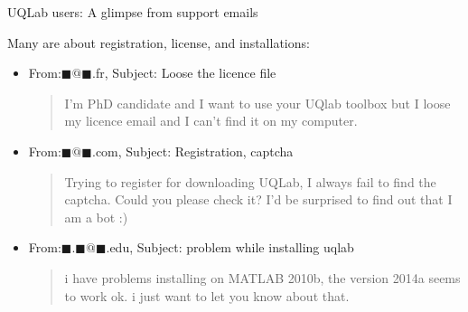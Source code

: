 \documentclass[]{rsuqbeamernew}
\begin{document}
\begin{frame}{UQLab users: A glimpse from support emails}
  
  Many are about registration, license, and installations:
  \begin{itemize}
    \item From:$\blacksquare@\blacksquare$.fr, Subject: Loose the licence file
    \begin{quotation}
     I'm PhD candidate and I want to use your UQlab toolbox but I loose my licence email and I can't find it on my computer.
    \end{quotation}
  \item From:$\blacksquare@\blacksquare$.com, Subject: Registration, captcha
  \begin{quotation}
  Trying to register for downloading UQLab, I always fail to find the captcha. Could you please check it? I'd be surprised to find out that I am a bot :)
\end{quotation}
\item From:$\blacksquare.\blacksquare@\blacksquare$.edu, Subject: problem while installing uqlab
\begin{quotation}
  i have problems installing on MATLAB 2010b, the version 2014a seems to work ok. i just want to let you know about that. 
\end{quotation}
\end{itemize}
\end{frame}
\end{document}
